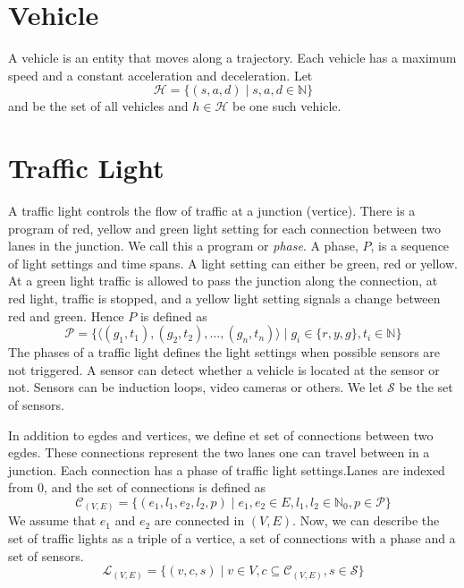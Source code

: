 \section{Vehicle}
A vehicle is an entity that moves along a trajectory. Each vehicle has a maximum speed and a constant acceleration and deceleration.
Let
\[
\mathcal{H} = \{(s, a, d)\mid s, a, d\in \mathbb{N}\}
\]
and be the set of all vehicles and $h\in \mathcal{H}$ be one such vehicle.

\section{Traffic Light}
A traffic light controls the flow of traffic at a junction (vertice). 
There is a program of red, yellow and green light setting for each connection between two lanes in the junction.
We call this a program or \textit{phase}. A phase, $P$, is a sequence of light settings and time spans. A light setting can either be green, red or yellow. At a green light traffic is allowed to pass the junction along the connection, at red light, traffic is stopped, and a yellow light setting signals a change between red and green. Hence $P$ is defined as
\[
\mathcal{P} =\{ \langle(g_1, t_1),(g_2, t_2),\dots, (g_n, t_n) \rangle\mid g_i\in \{r, y, g\}, t_i\in \mathbb{N}\}
\]
The phases of a traffic light defines the light settings when possible sensors are not triggered. 
A sensor can detect whether a vehicle is located at the sensor or not. Sensors can be induction loops, video cameras or others. We let $\mathcal{S}$ be the set of sensors.

In addition to egdes and vertices, we define et set of connections between two egdes. These connections represent the two lanes one can travel between in a junction. Each connection has a phase of traffic light settings.Lanes are indexed from $0$, and the set of connections is defined as
\[
\mathcal{C}_{(V, E)} = \{(e_1, l_1, e_2, l_2, p) \mid e_1, e_2 \in E, l_1, l_2\in \mathbb{N}_0, p\in \mathcal{P}\}
\]
We assume that $e_1$ and $e_2$ are connected in $(V, E)$.
Now, we can describe the set of traffic lights as a triple of a vertice, a set of connections with a phase and a set of sensors.
\[
\mathcal{L}_{(V,E)} = \{(v, c, s)\mid v\in V, c\subseteq \mathcal{C}_{(V,E)}, s\in \mathcal{S}\}
\]






